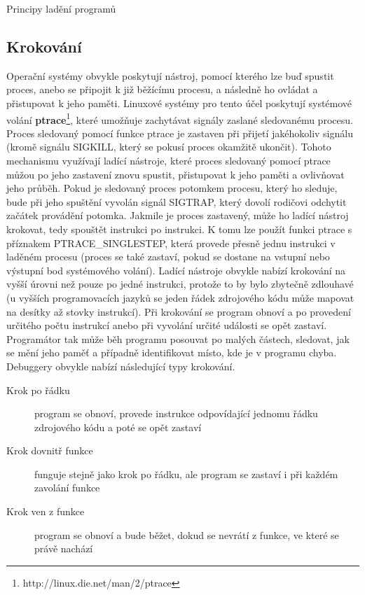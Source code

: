 \documentclass[czech,bachelor,male,python,dept460]{diploma}						%
\begin{document}
\begin{section}{Principy ladění programů}
	\subsection{Krokování}
		Operační systémy obvykle poskytují nástroj, pomocí kterého lze buď spustit proces, anebo se připojit k již běžícímu procesu, a následně ho ovládat
		a přistupovat k jeho paměti. Linuxové systémy pro tento účel poskytují systémové volání \textbf{ptrace}\footnote{http://linux.die.net/man/2/ptrace},
		které umožňuje zachytávat signály zaslané sledovanému procesu. Proces sledovaný pomocí funkce ptrace je zastaven při přijetí jakéhokoliv signálu
		(kromě signálu SIGKILL, který se pokusí proces okamžitě ukončit). Tohoto mechanismu využívají ladící nástroje, které proces sledovaný pomocí
		ptrace můžou po jeho zastavení znovu spustit, přistupovat k jeho paměti a ovlivňovat jeho průběh. Pokud je sledovaný proces potomkem procesu,
		který ho sleduje, bude při jeho spuštění vyvolán signál SIGTRAP, který dovolí rodičovi odchytit začátek provádění potomka. Jakmile je proces
		zastavený, může ho ladící nástroj krokovat, tedy spouštět instrukci po instrukci. K tomu lze použít funkci ptrace s příznakem PTRACE\_SINGLESTEP,
		která provede přesně jednu instrukci v laděném procesu (proces se také zastaví, pokud se dostane na vstupní nebo výstupní bod systémového volání).
		Ladící nástroje obvykle nabízí krokování na vyšší úrovni než pouze po jedné instrukci, protože to by bylo zbytečně zdlouhavé (u vyšších programovacích
		jazyků se jeden řádek zdrojového kódu může mapovat na desítky až stovky instrukcí).
		Při krokování se program obnoví a po provedení určitého počtu instrukcí anebo při vyvolání určité události se opět zastaví. Programátor tak může
		běh programu posouvat po malých částech, sledovat, jak se mění jeho paměť a případně identifikovat místo, kde je v programu chyba.
		Debuggery obvykle nabízí následující typy krokování.
		
		\begin{description}
			\item[Krok po řádku] program se obnoví, provede instrukce odpovídající jednomu řádku zdrojového kódu a poté se opět zastaví
			\item[Krok dovnitř funkce] funguje stejně jako krok po řádku, ale program se zastaví i při každém zavolání funkce
			\item[Krok ven z funkce] program se obnoví a bude běžet, dokud se nevrátí z funkce, ve které se právě nachází
		\end{description}
		

\end{section}
\end{document}
